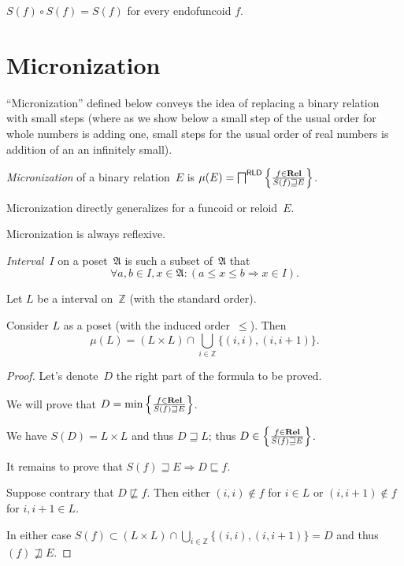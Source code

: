 \begin{conjecture}
$S(f)\circ S(f)=S(f)$ for every endofuncoid $f$.\end{conjecture}

\section{Micronization}

``Micronization'' defined below conveys the idea of replacing a binary relation
with small steps (where as we show below a small step of the usual order for whole numbers is adding one,
small steps for the usual order of real numbers is addition of an an infinitely small).

\begin{defn}
\emph{Micronization} of a binary relation~$E$ is
$\mu(E) = \bigsqcap^{\mathsf{RLD}} \left\{ \frac{f\in\mathbf{Rel}}{S(f)\sqsupseteq E}\right\}$.
\end{defn}

\begin{rem}
Micronization directly generalizes for a funcoid or reloid~$E$.
\end{rem}

\begin{obvious}
Micronization is always reflexive.
\end{obvious}

\begin{defn}
\emph{Interval}~$I$ on a poset~$\mathfrak{A}$ is such a subset of~$\mathfrak{A}$ that
\[ \forall a,b\in I, x\in\mathfrak{A}:(a\leq x\leq b\Rightarrow x\in I). \]
\end{defn}

Let $L$ be a interval on~$\mathbb{Z}$ (with the standard order).

\begin{prop}
Consider $L$ as a poset (with the induced order~$\leq$). Then
\[ \mu(L) = (L\times L) \cap \bigcup_{i\in\mathbb{Z}} \{(i,i), (i,i+1)\}. \]
\end{prop}

\begin{proof}
Let's denote~$D$ the right part of the formula to be proved.

We will prove that $D = \min \left\{ \frac{f\in\mathbf{Rel}}{S(f)\sqsupseteq E}\right\}$.

We have $S(D)=L\times L$ and thus $D\sqsupseteq L$; thus $D\in\left\{ \frac{f\in\mathbf{Rel}}{S(f)\sqsupseteq E}\right\}$.

It remains to prove that $S(f)\sqsupseteq E\Rightarrow D\sqsubseteq f$.

Suppose contrary that $D\nsqsubseteq f$. Then either $(i,i)\notin f$ for $i\in L$ or $(i,i+1)\notin f$ for $i,i+1\in L$.

In either case $S(f)\subset (L\times L) \cap \bigcup_{i\in\mathbb{Z}} \{(i,i), (i,i+1)\} = D$
and thus $(f)\nsqsupseteq E$.
\end{proof}

